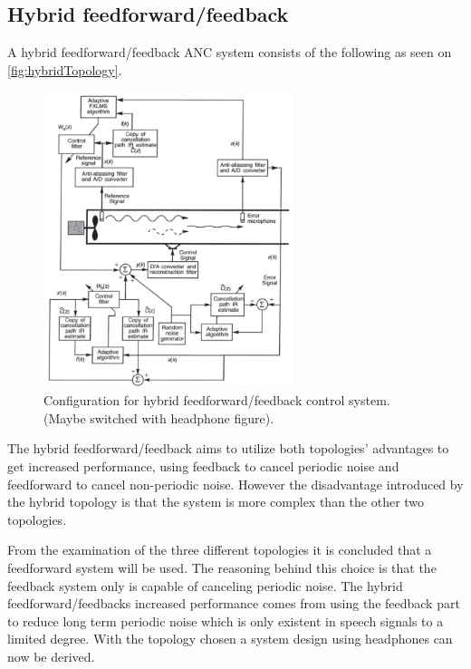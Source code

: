\subsection*{Hybrid feedforward/feedback}    
A hybrid feedforward/feedback ANC system consists of the following as seen on \autoref{fig:hybridTopology}.
\begin{figure}[H]
	\centering
	\includegraphics[width=0.65\textwidth]{figures/BasicSystem/hybrid}
	\caption{Configuration for hybrid feedforward/feedback control system. (Maybe switched with headphone figure).}
	\label{fig:hybridTopology}
\end{figure}

The hybrid feedforward/feedback aims to utilize both topologies' advantages to get increased performance, using feedback to cancel periodic noise and feedforward to cancel non-periodic noise. However the disadvantage introduced by the hybrid topology is that the system is more complex than the other two topologies.   


From the examination of the three different topologies it is concluded that a feedforward system will be used. The reasoning behind this choice is that the feedback system only is capable of canceling periodic noise. The hybrid feedforward/feedbacks increased performance comes from using the feedback part to reduce long term periodic noise which is only existent in speech signals to a limited degree. With the topology chosen a system design using headphones can now be derived. 